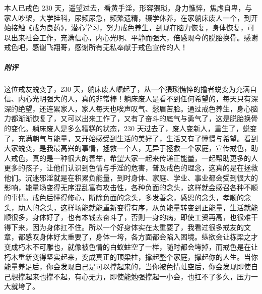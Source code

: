 \begin{case}
    本人已戒色 230 天，遥望过去，看黄手淫，形容猥琐，身力憔悴，焦虑自卑，与家人吵架，大学挂科，尿频尿急，频繁遗精，辍学休养，在家躺床废人一个，到开始接触《戒为良药》，潜心学习，努力戒色养生，到现在脑力恢复，身体恢复，可以出来社会工作，充满信心，内心光明、平静而强大，倍感现今的脱胎换骨。感谢戒色吧，感谢飞翔哥，感谢所有无私奉献于戒色宣传的人！
    \subparagraph{附评} 这位戒友蜕变了，230 天，躺床废人崛起了，从一个猥琐憔悴的撸者蜕变为充满自信、内心光明强大的人，真的非常棒！躺床废人是看不到任何希望的，每天只有深深的绝望，还连累家人，家人每天也唉声叹气、愁眉苦脸。通过戒色养生，身心脑力都渐渐恢复了，又可以出来工作了，又有了奋斗的底气与勇气了，这是脱胎换骨的变化。躺床废人是多么糟糕的状态，230 天过去了，废人变新人，重生了，蜕变了，充满朝气与能量，又开始感受到生活的美好了，生活又有了憧憬与希望。看到大家蜕变，是我最高兴的事情，拯救一个人，无异于拯救一个家庭，宣传戒色，助人戒色，真的是一种很大的善举，希望大家一起来传递正能量，一起帮助更多的人更多的孩子，让他们认识到色情与手淫的危害，普及戒色的理念，这真的是在拯救他们。沉迷邪淫就是在积累负能量，到时身体、家庭、学业、事业都会受到很大的影响，能量场变得无序混乱富有攻击性，各种负面的念头，这样就会感召各种不顺的事情。戒色后懂得修心，断除负面的念头，多发善念，感恩的念头，孝顺的念头，助人的念头，这样场能就能重新变得有序，从负能量转变到正能量，生活就能顺很多，身体好了，也有本钱去奋斗了，否则一身的病，即使工资再高，也很难干得下来，因为身体扛不住。所以一个好身体实在太重要了，我看过很多戒友的文章，都感叹身体好太重要了，身体一垮，各方面都会陷入困境。纵欲会让栋梁之才变成朽木不可雕也，就像被色情的白蚁蛀空了一样，随时都会垮掉，而戒色是在让朽木重新变得坚实起来，变成真正的顶梁柱，撑起整个家庭，撑起你的人生。当你能量养足后，你会发现自己是可以撑起来的，当你被色情蛀空后，你会发现即使自己想撑起来也撑不起，有心无力，即使能勉强撑起一小会，也扛不了多久，压力一大就垮了。
\end{case}

